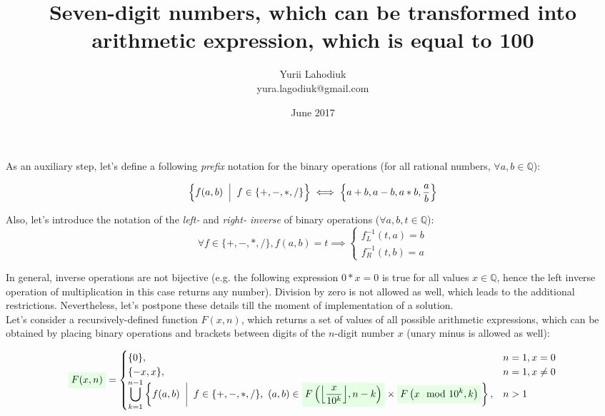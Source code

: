 \documentclass{article}
\newcommand{\highlight}[1]{\colorbox{green!10}{$\displaystyle#1$}}
\DeclarePairedDelimiter\floor{\lfloor}{\rfloor}
\begin{document}
\title{Seven-digit numbers, which can be transformed into arithmetic expression, which is equal to 100}
\author{Yurii Lahodiuk \\ yura.lagodiuk@gmail.com}
\date{June 2017}
\maketitle

As an auxiliary step, let's define a following \textit{prefix} notation for the binary operations (for all rational numbers, $\forall a, b \in \mathbb{Q}$):

\begin{equation}
	\Big\{ f(a, b) \ \ \vline \ \ f \in \{+, -, *, /\} \Big\} \iff \left\{ a + b, a - b, a * b, {a \over b} \right\}
\end{equation}

Also, let's introduce the notation of the \textit{left- } and \textit{right- inverse} of binary operations ($\forall a, b, t \in \mathbb{Q}$):
\begin{equation}
	\forall f \in \{+, -, *, /\}, f(a,b) = t \implies 
	\begin{cases}
		f_L^{-1}(t, a) = b \\
		f_R^{-1}(t, b) = a
	\end{cases}
\end{equation}

In general, inverse operations are not bijective (e.g. the following expression $0 * x = 0$ is true for all values $x \in \mathbb{Q}$, hence the left inverse operation of multiplication in this case returns any number). Division by zero is not allowed as well, which leads to the additional restrictions. Nevertheless, let's postpone these details till the moment of implementation of a solution. \\

Let's consider a recursively-defined function $F(x,n)$, which returns a set of values of all possible arithmetic expressions, which can be obtained by placing binary operations and brackets between digits of the $n$-digit number $x$ (unary minus is allowed as well):

\begin{equation} \label{eq:3}
\begin{split}
	\highlight{F(x, n)} =
	\begin{cases}
		\{0\}, 		& n = 1, x = 0 \\
		\{-x, x\},	& n = 1, x \neq 0 \\
		\displaystyle\bigcup_{k=1}^{n-1} \left\{ f(a, b) \ \ \vline \ \ f \in \{+, -, *, /\},\ (a, b) \in \highlight{F\left(\floor*{x \over 10^k}, n-k\right)} \times \highlight{F\left(x \mod 10^k, k\right)}  \right\}, & n > 1
	\end{cases}
\end{split}
\end{equation}
\end{document}

